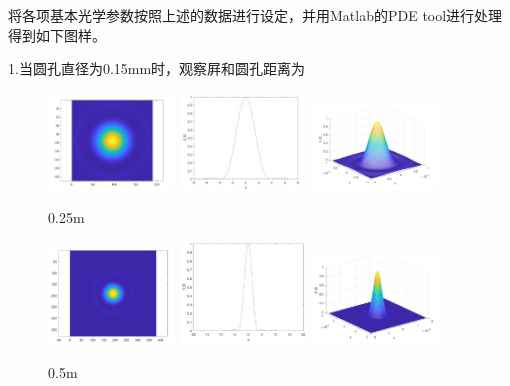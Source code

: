 \documentclass[12pt,a4paper,UTF8]{ctexart}
\begin{document}
将各项基本光学参数按照上述的数据进行设定，并用Matlab的PDE tool进行处理得到如下图样。

1.当圆孔直径为0.15mm时，观察屛和圆孔距离为
\begin{figure}[htbp]
	\centering
	\includegraphics[width=0.3\textwidth]{img//0.251.jpg}
	\includegraphics[width=0.3\textwidth]{img//0.252.jpg}
	\includegraphics[width=0.3\textwidth]{img//0.253.jpg}
	\caption{0.25m}
\end{figure}

\begin{figure}[htbp]
	\centering
	\includegraphics[width=0.3\textwidth]{img//0.51.jpg}
	\includegraphics[width=0.3\textwidth]{img//0.52.jpg}
	\includegraphics[width=0.3\textwidth]{img//0.53.jpg}
	\caption{0.5m}
\end{figure}
\end{document}
